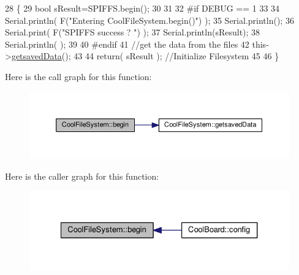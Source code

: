 \begin{DoxyCode}
28 \{
29     \textcolor{keywordtype}{bool} sResult=SPIFFS.begin();
30     
31 
32 \textcolor{preprocessor}{#if DEBUG == 1}
33 
34     Serial.println( F(\textcolor{stringliteral}{"Entering CoolFileSystem.begin()"}) );
35     Serial.println();   
36     Serial.print( F(\textcolor{stringliteral}{"SPIFFS success ? "}) );
37     Serial.println(sResult);
38     Serial.println(  );
39 
40 \textcolor{preprocessor}{#endif}
41     \textcolor{comment}{//get the data from the files}
42     this->\hyperlink{class_cool_file_system_a70701d05e811604af1b531f4f6dc69ed}{getsavedData}();
43 
44     \textcolor{keywordflow}{return}( sResult  );                                   \textcolor{comment}{//Initialize Filesystem}
45 
46 \}
\end{DoxyCode}
Here is the call graph for this function\+:\nopagebreak
\begin{figure}[H]
\begin{center}
\leavevmode
\includegraphics[width=350pt]{db/d0c/class_cool_file_system_a6ba6f666ed4c530174f8569d2c636748_cgraph}
\end{center}
\end{figure}
Here is the caller graph for this function\+:\nopagebreak
\begin{figure}[H]
\begin{center}
\leavevmode
\includegraphics[width=327pt]{db/d0c/class_cool_file_system_a6ba6f666ed4c530174f8569d2c636748_icgraph}
\end{center}
\end{figure}
\mbox{\label{class_cool_file_system_a13f2958f5b87757c31fc53797a30d23a}} 
